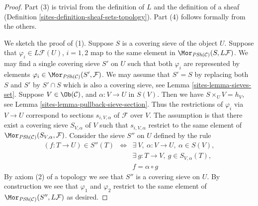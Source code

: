 \begin{proof}

Part (3) is trivial from the definition of $L$ and
the definition of a sheaf (Definition \ref{sites-definition-sheaf-sets-topology}).
Part (4) follows formally from the others.

\medskip\noindent
We sketch the proof of (1). Suppose $S$ is a covering sieve
of the object $U$. Suppose that $\varphi_i \in L\mathcal{F}(U)$,
$i = 1, 2$ map to the same element in
$\Mor_{\textit{PSh}(\mathcal{C})}(S, L\mathcal{F})$.
We may find a single covering sieve $S'$ on $U$ such
that both $\varphi_i$ are represented by elements
$\varphi_i \in \Mor_{\textit{PSh}(\mathcal{C})}(S', \mathcal{F})$.
We may assume that $S' = S$ by replacing both $S$ and $S'$ by
$S' \cap S$ which is also a covering sieve, see Lemma \ref{sites-lemma-sieves-set}.
Suppose $V\in \Ob(\mathcal{C})$, and
$\alpha : V \to U$ in $S(V)$.
Then we have $S \times_U V = h_V$,
see Lemma \ref{sites-lemma-pullback-sieve-section}. Thus the restrictions
of $\varphi_i$ via $V \to U$ correspond to sections $s_{i, V, \alpha}$
of $\mathcal{F}$ over $V$. The assumption is that there exist
a covering sieve $S_{V, \alpha}$ of $V$ such that
$s_{i, V, \alpha}$ restrict to the same element of
$\Mor_{\textit{PSh}(\mathcal{C})}(S_{V, \alpha}, \mathcal{F})$.
Consider the sieve $S''$ on $U$ defined by the rule
\begin{eqnarray}
\label{equation-S-prime-prime}
(f : T \to U) \in S''(T)
& \Leftrightarrow &
\exists\ V , \ \alpha : V \to U, \ \alpha \in S(V), \nonumber \\
& &
\exists\ g : T \to V, \ g \in S_{V, \alpha}(T), \\
& &
f = \alpha \circ g \nonumber
\end{eqnarray}
By axiom (2) of a topology we see that $S''$ is a covering
sieve on $U$. By construction we see that $\varphi_1$
and $\varphi_2$ restrict to the same element of
$\Mor_{\textit{PSh}(\mathcal{C})}(S'', L\mathcal{F})$
as desired.


\end{proof}
